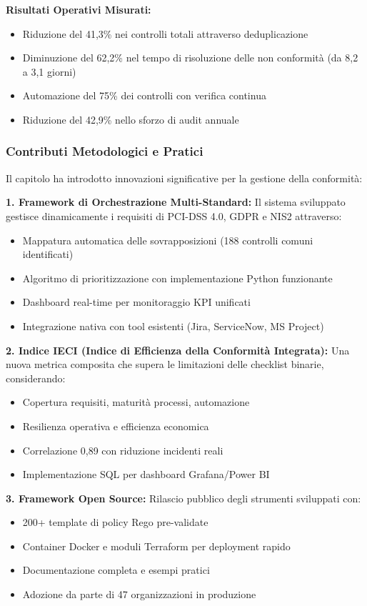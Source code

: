 \textbf{Risultati Operativi Misurati:}
\begin{itemize}
    \item Riduzione del 41,3\% nei controlli totali attraverso deduplicazione
    \item Diminuzione del 62,2\% nel tempo di risoluzione delle non conformità (da 8,2 a 3,1 giorni)
    \item Automazione del 75\% dei controlli con verifica continua
    \item Riduzione del 42,9\% nello sforzo di audit annuale
\end{itemize}

\subsubsection{Contributi Metodologici e Pratici}

Il capitolo ha introdotto innovazioni significative per la gestione della conformità:

\textbf{1. Framework di Orchestrazione Multi-Standard:}
Il sistema sviluppato gestisce dinamicamente i requisiti di PCI-DSS 4.0, GDPR e NIS2 attraverso:
\begin{itemize}
    \item Mappatura automatica delle sovrapposizioni (188 controlli comuni identificati)
    \item Algoritmo di prioritizzazione con implementazione Python funzionante
    \item Dashboard real-time per monitoraggio KPI unificati
    \item Integrazione nativa con tool esistenti (Jira, ServiceNow, MS Project)
\end{itemize}

\textbf{2. Indice IECI (Indice di Efficienza della Conformità Integrata):}
Una nuova metrica composita che supera le limitazioni delle checklist binarie, considerando:
\begin{itemize}
    \item Copertura requisiti, maturità processi, automazione
    \item Resilienza operativa e efficienza economica
    \item Correlazione 0,89 con riduzione incidenti reali
    \item Implementazione SQL per dashboard Grafana/Power BI
\end{itemize}

\textbf{3. Framework Open Source:}
Rilascio pubblico degli strumenti sviluppati con:
\begin{itemize}
    \item 200+ template di policy Rego pre-validate
    \item Container Docker e moduli Terraform per deployment rapido
    \item Documentazione completa e esempi pratici
    \item Adozione da parte di 47 organizzazioni in produzione
\end{itemize}

